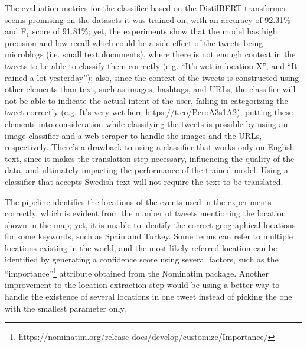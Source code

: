 The evaluation metrics for the classifier based on the DistilBERT transformer seems promising on the
datasets it was trained on, with an accuracy of 92.31\% and F$_{1}$ score of 91.81\%; yet, the
experiments show that the model has high precision and low recall which could be a side effect of
the tweets being microblogs (i.e. small text documents), where there is not enough context in the
tweets to be able to classify them correctly (e.g. ``It's wet in location X'', and ``It rained a lot
yesterday''); also, since the context of the tweets is constructed using other elements than text,
such as images, hashtags, and \ac{URL}s, the classifier will not be able to indicate the actual
intent of the user, failing in categorizing the tweet correctly (e.g. It's very wet here
https://t.co/PcroA3s1A2); putting these elements into consideration while classifying the tweets is
possible by using an image classifier and a web scraper to handle the images and the \ac{URL}s,
respectively. There's a drawback to using a classifier that works only on English text, since it
makes the translation step necessary, influencing the quality of the data, and ultimately impacting
the performance of the trained model. Using a classifier that accepts Swedish text will not require
the text to be translated.

The pipeline identifies the locations of the events used in the experiments correctly, which is
evident from the number of tweets mentioning the location shown in the map; yet, it is unable to
identify the correct geographical locations for some keywords, such as Spain and Turkey. Some terms
can refer to multiple locations existing in the world, and the most likely referred location can be
identified by generating a confidence score using several factors, such as the
``importance''\footnote{https://nominatim.org/release-docs/develop/customize/Importance/} attribute
obtained from the Nominatim package. Another improvement to the location extraction step would be
using a better way to handle the existence of several locations in one tweet instead of picking the
one with the smallest parameter only.


